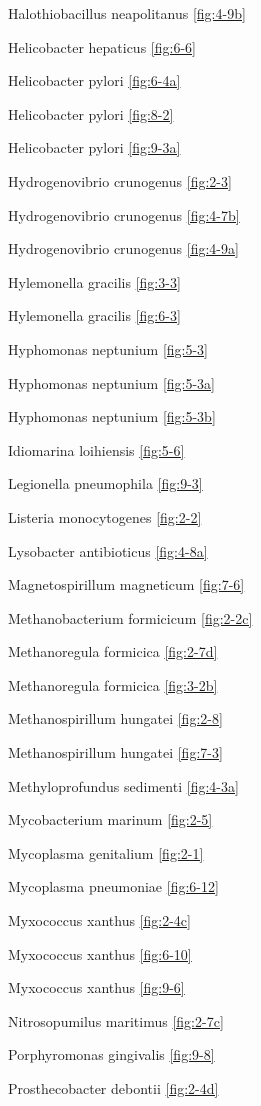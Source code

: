 \documentclass[]{tufte-book}
\begin{document}
Halothiobacillus neapolitanus \ref{fig:4-9b}

Helicobacter hepaticus \ref{fig:6-6}

Helicobacter pylori \ref{fig:6-4a}

Helicobacter pylori \ref{fig:8-2}

Helicobacter pylori \ref{fig:9-3a}

Hydrogenovibrio crunogenus \ref{fig:2-3}

Hydrogenovibrio crunogenus \ref{fig:4-7b}

Hydrogenovibrio crunogenus \ref{fig:4-9a}

Hylemonella gracilis \ref{fig:3-3}

Hylemonella gracilis \ref{fig:6-3}

Hyphomonas neptunium \ref{fig:5-3}

Hyphomonas neptunium \ref{fig:5-3a}

Hyphomonas neptunium \ref{fig:5-3b}

Idiomarina loihiensis \ref{fig:5-6}

Legionella pneumophila \ref{fig:9-3}

Listeria monocytogenes \ref{fig:2-2}

Lysobacter antibioticus \ref{fig:4-8a}

Magnetospirillum magneticum \ref{fig:7-6}

Methanobacterium formicicum \ref{fig:2-2c}

Methanoregula formicica \ref{fig:2-7d}

Methanoregula formicica \ref{fig:3-2b}

Methanospirillum hungatei \ref{fig:2-8}

Methanospirillum hungatei \ref{fig:7-3}

Methyloprofundus sedimenti \ref{fig:4-3a}

Mycobacterium marinum \ref{fig:2-5}

Mycoplasma genitalium \ref{fig:2-1}

Mycoplasma pneumoniae \ref{fig:6-12}

Myxococcus xanthus \ref{fig:2-4c}

Myxococcus xanthus \ref{fig:6-10}

Myxococcus xanthus \ref{fig:9-6}

Nitrosopumilus maritimus \ref{fig:2-7c}

Porphyromonas gingivalis \ref{fig:9-8}

Prosthecobacter debontii \ref{fig:2-4d}
\end{document}
